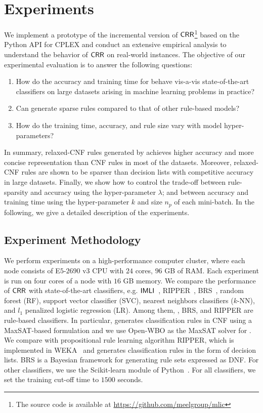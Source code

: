 \section{Experiments}\label{interpretability_crr_sec:experiment}
We implement a prototype  of  the incremental version of $ \mathsf{CRR} $\footnote{The source code is available at \url{https://github.com/meelgroup/mlic}} based on the  Python API for CPLEX  and conduct an extensive  empirical analysis to understand the behavior of $\mathsf{CRR}$ on real-world instances. The objective of our experimental evaluation is to answer the following questions:


\begin{enumerate}
	\item How do the accuracy and training time for  {\crr}  behave vis-a-vis state-of-the-art classifiers on large datasets arising in machine learning problems in practice?
	\item Can {\crr} generate sparse rules compared to that of  other rule-based models? 
	\item How do the training time, accuracy, and rule size vary with model hyper-parameters?
\end{enumerate}


In summary, relaxed-CNF rules generated by {\crr} achieves higher accuracy and more concise representation than CNF rules in most of the datasets. Moreover, relaxed-CNF rules are shown to be sparser than decision lists with competitive accuracy in large datasets.  Finally, we show how to control the trade-off between rule-sparsity and accuracy using the hyper-parameter $ \lambda $; and between accuracy and training time using the hyper-parameter $ k $ and size $ n_p $ of each mini-batch. In the following, we give a detailed description of the experiments. 



\subsection{Experiment Methodology}
We perform experiments on a high-performance computer cluster, where each node consists of E$ 5$-$2690\text{ v}3 $ CPU with $ 24 $ cores, $ 96 $ GB of RAM. Each experiment is run on four cores of a node with $ 16 $ GB memory.   We compare the performance of  $ \mathsf{CRR} $   with  state-of-the-art classifiers, e.g. $ \mathsf{IMLI}  $~\cite{ghosh19incremental}, RIPPER~\cite{C1995}, BRS~\cite{WRDLKM2017},  random forest (RF), support vector classifier (SVC), nearest neighbors classifiers ($ k $-NN), and $ l_1 $ penalized logistic regression (LR). Among them, {\IMLI}, BRS, and RIPPER are rule-based classifiers. In particular,
{\IMLI} generates classification rules in CNF using a MaxSAT-based formulation and we use Open-WBO \cite{MML2014} as the MaxSAT solver for {\IMLI}. We compare with propositional rule learning algorithm RIPPER, which is implemented in WEKA~\cite{HFHPRW2009} and generates classification rules in the form of decision lists. BRS is a Bayesian framework for generating rule sets expressed as DNF. For  other classifiers, we use the Scikit-learn module of Python~\cite{PVGMTGB2011}. For all  classifiers, we set the training cut-off time to $ 1500 $  {seconds}. 

